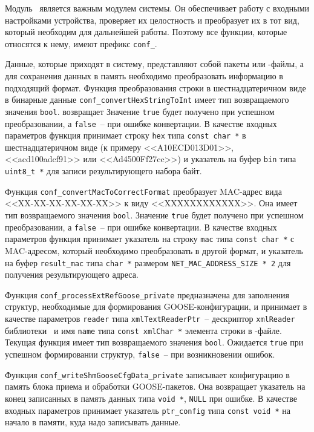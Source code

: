 Модуль \moduleCfg\ является важным модулем системы. Он обеспечивает
работу с входными настройками устройства, проверяет их целостность
и преобразует их в тот вид, который необходим для дальнейшей работы.
Поэтому все функции, которые относятся к нему, имеют префикс \lstinline{conf_}.

Данные, которые приходят в систему, представляют собой пакеты или \cid-файлы, а для сохранения данных в память необходимо преобразовать информацию в подходящий формат.
Функция преобразования строки в шестнадцатеричном виде в бинарные данные \lstinline{conf_convertHexStringToInt} имеет тип возвращаемого значения \lstinline{bool}. возвращает
Значение \lstinline{true} будет получено при успешном преобразовании, а \lstinline{false}~-- при ошибке конвертации. В качестве входных параметров функция принимает строку \lstinline{hex} типа
\lstinline{const char *} в шестнадцатеричном виде (к примеру <<A10ECD013D01>>, <<acd100adcf91>> или  <<Ad4500Ff27cc>>) и указатель на буфер
\lstinline{bin} типа \lstinline{uint8_t *} для записи результирующего набора байт.

Функция \lstinline{conf_convertMacToCorrectFormat} преобразует MAC-адрес вида <<XX-XX-XX-XX-XX-XX>> к виду <<XXXXXXXXXXXX>>. Она имеет тип
возвращаемого значения \lstinline{bool}. Значение \lstinline{true} будет получено при успешном преобразовании, а \lstinline{false}~-- при ошибке конвертации. В качестве входных
параметров функция принимает указатель на строку \lstinline{mac} типа \lstinline{const char *} с MAC-адресом, который необходимо преобразовать в другой формат, и
указатель на буфер \lstinline{result_mac} типа \lstinline{char *} размером \lstinline{NET_MAC_ADDRESS_SIZE * 2} для получения результирующего адреса.

Функция \lstinline{conf_processExtRefGoose_private} предназначена для заполнения структур, необходимые для формирования GOOSE-конфигурации, и принимает в качестве параметров \lstinline{reader}
типа \lstinline{xmlTextReaderPtr}~-- дескриптор \lstinline{xmlReader} библиотеки \libXml\ и имя \lstinline{name} типа \lstinline{const xmlChar *} элемента строки в \cid-файле.
Текущая функция имеет тип возвращаемого значения \lstinline{bool}. Ожидается \lstinline{true} при успешном формировании структур, \lstinline{false}~-- при
возникновении ошибок.

Функция \lstinline{conf_writeShmGooseCfgData_private} записывает конфигурацию в память блока приема и обработки GOOSE-пакетов. Она возвращает указатель на конец записанных в память данных типа \lstinline{void *}, \lstinline{NULL} при ошибке. В качестве входных параметров принимает указатель \lstinline{ptr_config} типа
\lstinline{const void *} на начало в памяти, куда надо записывать данные.

